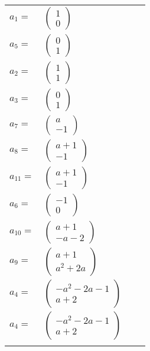 \documentclass[1p]{elsarticle_modified}
\theoremstyle{definition}
\begin{document}
\begin{tabular}{m{7pt} m{180pt} m{7pt} m{180pt} }
\flushright $a_{1}=$&$\begin{pmatrix}1\\0\end{pmatrix}$ \\
\flushright $a_{5}=$&$\begin{pmatrix}0\\1\end{pmatrix}$ \\
\flushright $a_{2}=$&$\begin{pmatrix}1\\1\end{pmatrix}$ \\
\flushright $a_{3}=$&$\begin{pmatrix}0\\1\end{pmatrix}$ \\
\flushright $a_{7}=$&$\begin{pmatrix}a\\-1\end{pmatrix}$ \\
\flushright $a_{8}=$&$\begin{pmatrix}a+1\\-1\end{pmatrix}$ \\
\flushright $a_{11}=$&$\begin{pmatrix}a+1\\-1\end{pmatrix}$ \\
\flushright $a_{6}=$&$\begin{pmatrix}-1\\0\end{pmatrix}$ \\
\flushright $a_{10}=$&$\begin{pmatrix}a+1\\- a-2\end{pmatrix}$ \\
\flushright $a_{9}=$&$\begin{pmatrix}a+1\\a^2+2 a\end{pmatrix}$ \\
\flushright $a_{4}=$&$\begin{pmatrix}- a^2-2 a-1\\a+2\end{pmatrix}$\\ \flushright $a_{4}=$&$\begin{pmatrix}- a^2-2 a-1\\a+2\end{pmatrix}$\\&\end{tabular}
\end{document}
